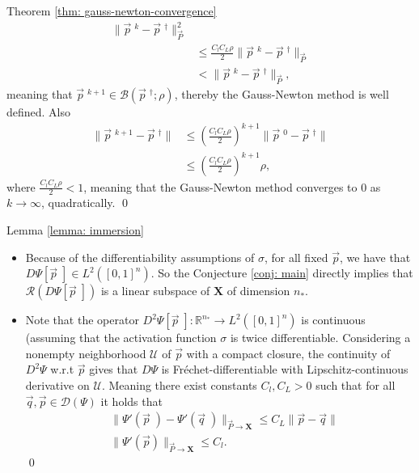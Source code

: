 \begin{myproof}{Theorem \ref{thm: gauss-newton-convergence}}
\begin{align}
        \|\vec{p}\;^{k} - \vec{p}\;^{\dagger}\|^{2}_{\vec{P}} \\
        &\le \frac{C_lC_L\rho}{2}
        \|\vec{p}\;^{k}-\vec{p}\;^{\dagger}\|_{\vec{P}} \\
        &< \|\vec{p}\;^{k} - \vec{p}\;^{\dagger}\|_{\vec{P}},
    \end{align}
    meaning that $\vec{p}\;^{k+1} \in \mathcal{B}(\vec{p}\;^{\dagger};
    \rho)$, thereby the Gauss-Newton method is well defined. Also
    \begin{align}
        \|\vec{p}\;^{k+1} - \vec{p}\;^{\dagger}\|
        &\leq \left( \frac{C_lC_L\rho}{2}  \right)^{k+1}
        \|\vec{p}\;^{0} - \vec{p}\;^{\dagger}\| \\
        &\le \left( \frac{C_lC_L\rho}{2}  \right)^{k+1} \rho,
    \end{align}
    where $\frac{C_lC_L\rho}{2} < 1$, meaning that the Gauss-Newton method
    converges to $0$ as $k\to \infty$, quadratically. \qed
\end{myproof}

\begin{myproof}{Lemma \ref{lemma: immersion}}
    \label{proof: lem-immersion}
    \begin{itemize}
        \item Because of the differentiability assumptions of $\sigma$, for
    all fixed $\vec{p}$, we have that $D\Psi[\vec{p}\;] \in
    L^{2}\left([0,1]^{n}\right)$. So the Conjecture \ref{conj: main} directly
    implies that $\mathcal{R}(D\Psi[\vec{p}\;])$ is a linear subspace of
    $\mathbf{X}$ of dimension $n_*$.
\item Note that the operator $D^{2}\Psi[\vec{p}\;]: \mathbb{R}^{n_*} \to
    L^{2}([0, 1]^{n})$ is continuous (assuming that the activation function
    $\sigma$ is twice differentiable. Considering a nonempty neighborhood
    $\mathcal{U}$ of $\vec{p}$ with a compact closure, the continuity of
    $D^{2}\Psi$ w.r.t $\vec{p}$ gives that $D\Psi$ is
    Fr\'echet-differentiable with Lipschitz-continuous derivative on
    $\mathcal{U}$. Meaning there exist constants $C_l, C_L > 0$ such that
    for all $\vec{q}, \vec{p} \in \mathcal{D}(\Psi)$ it holds that
        \begin{align}
            &\big\|\Psi'(\vec{p}\;) - \Psi'(\vec{q}\;)
            \big\|_{\vec{P}\to\mathbf{X}} \leq C_L \|\vec{p} - \vec{q} \|
            \\
            &\big\|\Psi'(\vec{p}) \big\|_{\vec{P} \to \mathbf{X}} \le
            C_l.
        \end{align}
        \qed
    \end{itemize}

\end{myproof}





\nocite{kaltenbacher2008}
\nocite{frischauf2022universal}
\printbibliography


